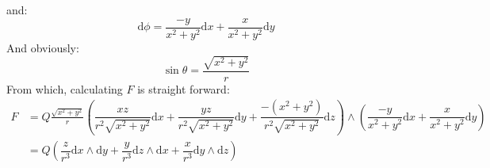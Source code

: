 \documentclass[12pt,a4]{article}
\newcommand{\e}{\mathrm{d}}
\begin{document}
\begin{enumerate}
\begin{equation*}
    \end{equation*}
    and:
    \begin{equation*}
      \e \phi = \dfrac{-y}{x^2+y^2} \e x + \dfrac{x}{x^2+y^2} \e y
    \end{equation*}
    And obviously:
    \begin{equation*}
      \sin \theta = \frac{\sqrt{x^2 + y^2}}{r}
    \end{equation*}
    From which, calculating $F$ is straight forward:
    \begin{align*}
      F &= Q \frac{\sqrt{x^2 + y^2}}{r} \left(\dfrac{xz}{r^2\sqrt{x^2+y^2}} \e x + \dfrac{yz}{r^2\sqrt{x^2+y^2}} \e y + \dfrac{-\left(x^2 + y^2\right)}{r^2\sqrt{x^2+y^2}} \e z\right) \wedge \left(\dfrac{-y}{x^2+y^2} \e x + \dfrac{x}{x^2+y^2} \e y\right)\\
        &= Q \left(\dfrac{z}{r^3} \e x \wedge \e y + \dfrac{y}{r^3} \e z \wedge \e x + \dfrac{x}{r^3} \e y \wedge \e z\right)
    \end{align*}
    
\end{enumerate}
\end{document}
